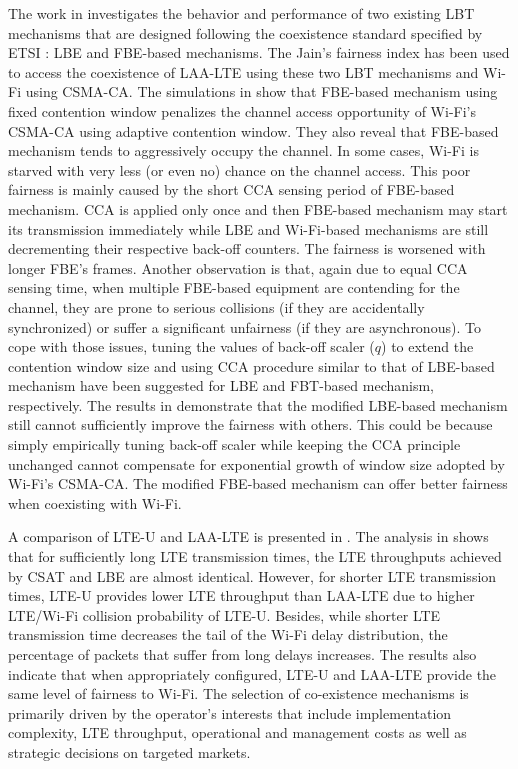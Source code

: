 The work in \cite{Enhanced-LTE-U-thesis-2015} investigates the behavior and performance of two existing LBT mechanisms that are designed following the coexistence standard specified by ETSI \cite{LBT-ETSI-2014}: LBE and FBE-based mechanisms. The Jain's fairness index has been used to access the coexistence of LAA-LTE using these two LBT mechanisms and Wi-Fi using CSMA-CA. The simulations in \cite{Enhanced-LTE-U-thesis-2015} show that FBE-based mechanism using fixed contention window penalizes the channel access opportunity of Wi-Fi's CSMA-CA using adaptive contention window. They also reveal that FBE-based mechanism tends to aggressively occupy the channel. In some cases, Wi-Fi is starved with very less (or even no) chance on the channel access. This poor fairness is mainly caused by the short CCA sensing period of FBE-based mechanism. CCA is applied only once and then FBE-based mechanism may start its transmission immediately while LBE and Wi-Fi-based mechanisms are still decrementing their respective back-off counters. The fairness is worsened with longer FBE's frames. Another observation is that, again due to equal CCA sensing time, when multiple FBE-based equipment are contending for the channel, they are prone to serious collisions (if they are accidentally synchronized) or suffer a significant unfairness (if they are asynchronous). To cope with those issues, tuning the values of back-off scaler ($q$) to extend the contention window size and using CCA procedure similar to that of LBE-based mechanism have been suggested for LBE and FBT-based mechanism, respectively. The results in \cite{Enhanced-LTE-U-thesis-2015} demonstrate that the modified LBE-based mechanism still cannot sufficiently improve the fairness with others. This could be because simply empirically tuning back-off scaler while keeping the CCA principle unchanged cannot compensate for exponential growth of window size adopted by Wi-Fi's CSMA-CA. The modified FBE-based mechanism can offer better fairness when coexisting with Wi-Fi.

A comparison of LTE-U and LAA-LTE is presented in \cite{LBT-CSAT-2015}. The analysis in \cite{LBT-CSAT-2015} shows that for sufficiently long LTE transmission times, the LTE throughputs achieved by CSAT and LBE are almost identical. However, for shorter LTE transmission times, LTE-U provides lower LTE throughput than LAA-LTE due to higher LTE/Wi-Fi collision probability of LTE-U. Besides, while shorter LTE transmission time decreases the tail of the Wi-Fi delay distribution, the percentage of packets that suffer from long delays increases. The results also indicate that when appropriately configured, LTE-U and LAA-LTE provide the same level of fairness to Wi-Fi. The selection of co-existence mechanisms is primarily driven by the operator's interests that include implementation complexity, LTE throughput, operational and management costs as well as strategic decisions on targeted markets.

